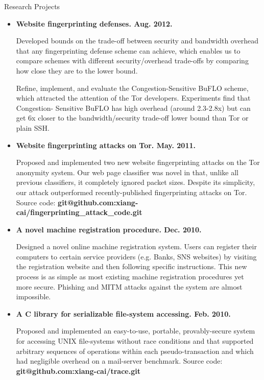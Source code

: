 \documentclass[11pt,oneside]{article}
\newenvironment{ressection}[1]{
	\vspace{4pt}
	{\fontfamily{phv}\selectfont\Large#1}
	\begin{itemize}
	\vspace{3pt}
}{
	\end{itemize}
}
\newcommand{\resitem}[1]{
	\vspace{-4pt}
	\item \begin{flushleft} #1 \end{flushleft}
}
\begin{document}
\begin{ressection}{Research Projects}

	\resitem{\textbf{Website fingerprinting defenses. Aug.
		2012.} 
		\begin{small}
		
		Developed bounds on the trade-off between security and
		bandwidth overhead that any fingerprinting defense scheme can
		achieve, which enables us to compare schemes with different
		security/overhead trade-offs by comparing how close they are
		to the lower bound. 
		
		Refine, implement, and evaluate
		the Congestion-Sensitive BuFLO scheme, which attracted the attention of the
		Tor developers. Experiments find that Congestion-
		Sensitive BuFLO has high overhead (around 2.3-2.8x) but can
		get 6x closer to the bandwidth/security trade-off lower bound
		than Tor or plain SSH.
		\end{small}				
	}

	\resitem{\textbf{Website fingerprinting attacks on Tor. May.
		2011.} 
		\begin{small}
		
		Proposed and implemented two new website fingerprinting
			attacks on the Tor anonymity system. Our web page
			classifier was novel in that, unlike all previous
			classifiers, it completely ignored packet sizes. Despite
			its simplicity, our attack outperformed 
			recently-published fingerprinting attacks on Tor. Source code: \textbf{git@github.com:xiang-cai/fingerprinting\_attack\_code.git}
		\end{small}				
	}

	\resitem{\textbf{A novel machine registration procedure. Dec.
		2010.}
		\begin{small}
		
		Designed a novel online machine
			registration system. Users can register their computers to
			certain service providers (e.g. Banks, SNS websites) by
			visiting the registration website and then following specific
			instructions. This new process is as simple as most existing
			machine registration procedures yet more secure. Phishing and MITM attacks against the
			system are almost impossible.
		\end{small}	
	}
			
	\resitem{\textbf{A C library for serializable file-system
				accessing. Feb. 2010.} 
		\begin{small}
		
		Proposed and implemented an
					easy-to-use, portable, provably-secure system for
					accessing UNIX file-systems without race conditions
					and that supported arbitrary sequences of operations
					within each pseudo-transaction and which had
					negligible overhead on a mail-server
					benchmark. Source code: \textbf{git@github.com:xiang-cai/trace.git}
		\end{small}
	}
	

\end{ressection}
\end{document}

